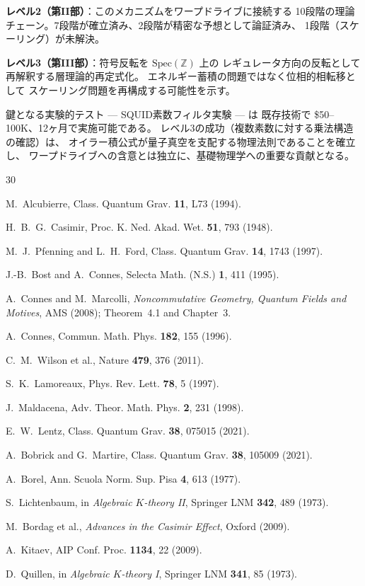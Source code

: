 \documentclass[11pt,a4paper]{article}
\newcommand{\Spec}{\mathrm{Spec}}
\begin{document}
\textbf{レベル2（第II部）}：このメカニズムをワープドライブに接続する
10段階の理論チェーン。7段階が確立済み、2段階が精密な予想として論証済み、
1段階（スケーリング）が未解決。

\textbf{レベル3（第III部）}：符号反転を $\Spec(\mathbb{Z})$ 上の
レギュレータ方向の反転として再解釈する層理論的再定式化。
エネルギー蓄積の問題ではなく位相的相転移として
スケーリング問題を再構成する可能性を示す。

鍵となる実験的テスト --- SQUID素数フィルタ実験 --- は
既存技術で \$50--100K、12ヶ月で実施可能である。
レベル3の成功（複数素数に対する乗法構造の確認）は、
オイラー積公式が量子真空を支配する物理法則であることを確立し、
ワープドライブへの含意とは独立に、基礎物理学への重要な貢献となる。

\begin{thebibliography}{30}

M.~Alcubierre, Class. Quantum Grav. \textbf{11}, L73 (1994).

H.~B.~G.~Casimir, Proc. K. Ned. Akad. Wet. \textbf{51}, 793 (1948).

M.~J.~Pfenning and L.~H.~Ford, Class. Quantum Grav. \textbf{14}, 1743 (1997).

J.-B.~Bost and A.~Connes, Selecta Math. (N.S.) \textbf{1}, 411 (1995).

A.~Connes and M.~Marcolli, \emph{Noncommutative Geometry, Quantum Fields
and Motives}, AMS (2008); Theorem~4.1 and Chapter~3.

A.~Connes, Commun. Math. Phys. \textbf{182}, 155 (1996).

C.~M.~Wilson et al., Nature \textbf{479}, 376 (2011).

S.~K.~Lamoreaux, Phys. Rev. Lett. \textbf{78}, 5 (1997).

J.~Maldacena, Adv. Theor. Math. Phys. \textbf{2}, 231 (1998).

E.~W.~Lentz, Class. Quantum Grav. \textbf{38}, 075015 (2021).

A.~Bobrick and G.~Martire, Class. Quantum Grav. \textbf{38}, 105009 (2021).

A.~Borel, Ann. Scuola Norm. Sup. Pisa \textbf{4}, 613 (1977).

S.~Lichtenbaum, in \emph{Algebraic $K$-theory II}, Springer LNM \textbf{342}, 489 (1973).

M.~Bordag et al., \emph{Advances in the Casimir Effect}, Oxford (2009).

A.~Kitaev, AIP Conf. Proc. \textbf{1134}, 22 (2009).

D.~Quillen, in \emph{Algebraic $K$-theory I}, Springer LNM \textbf{341}, 85 (1973).

\end{thebibliography}
\end{document}

